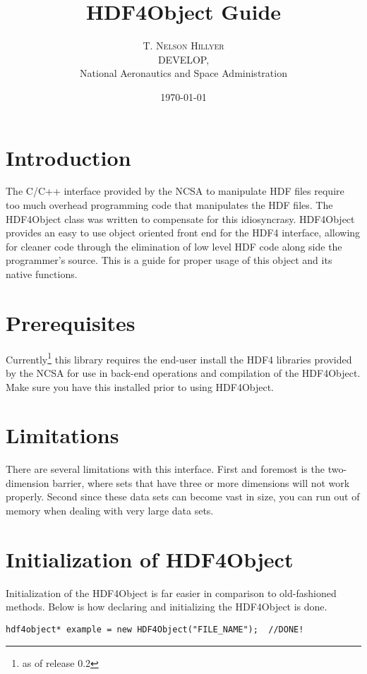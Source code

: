 \documentclass{report}
\begin{document}
\title{HDF4Object Guide}
\author{\textsc{T. Nelson Hillyer}\\
	DEVELOP,\\
	National Aeronautics and Space Administration}
\date{\today}
\maketitle

\section*{Introduction}
The C/C++ interface provided by the NCSA to manipulate HDF files require too much overhead programming code that manipulates the HDF files.  The HDF4Object class was written to compensate for this idiosyncrasy. HDF4Object provides an easy to use object oriented front end for the HDF4 interface, allowing for cleaner code through the elimination of low level HDF code along side the programmer's source.  This is a guide for proper usage of this object and its native functions.

\section*{Prerequisites}
Currently\footnote{as of release 0.2} this library requires the end-user install the HDF4 libraries provided by the NCSA for use in back-end operations and compilation of the HDF4Object.  Make sure you have this installed prior to using HDF4Object.

\section*{Limitations}
There are several limitations with this interface.  First and foremost is the two-dimension barrier, where sets that have three or more dimensions will not work properly.  Second since these data sets can become vast in size, you can run out of memory when dealing with very large data sets.

\section*{Initialization of HDF4Object}
Initialization of the HDF4Object is far easier in comparison to old-fashioned methods.  Below is how declaring and initializing the HDF4Object is done.
\begin{verbatim}
hdf4object* example = new HDF4Object("FILE_NAME");  //DONE!
\end{verbatim}
\end{document}
